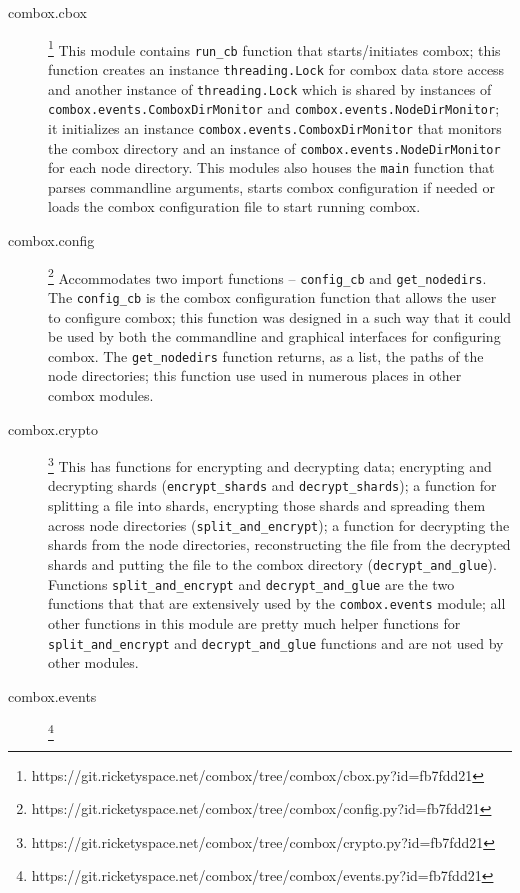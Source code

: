 \begin{description}
\item[combox.cbox]
  \footnote{https://git.ricketyspace.net/combox/tree/combox/cbox.py?id=fb7fdd21}
  This module contains \verb+run_cb+ function that starts/initiates
  combox; this function creates an instance \verb+threading.Lock+ for
  combox data store access and another instance of
  \verb+threading.Lock+ which is shared by instances of
  \verb+combox.events.ComboxDirMonitor+ and
  \verb+combox.events.NodeDirMonitor+; it initializes an instance
  \verb+combox.events.ComboxDirMonitor+ that monitors the combox
  directory and an instance of \verb+combox.events.NodeDirMonitor+ for
  each node directory. This modules also houses the \verb+main+
  function that parses commandline arguments, starts combox
  configuration if needed or loads the combox configuration file to
  start running combox.
\item[combox.config]
  \footnote{https://git.ricketyspace.net/combox/tree/combox/config.py?id=fb7fdd21}
  Accommodates two import functions -- \verb+config_cb+ and
  \verb+get_nodedirs+. The \verb+config_cb+ is the combox
  configuration function that allows the user to configure combox;
  this function was designed in a such way that it could be used by
  both the commandline and graphical interfaces for configuring
  combox. The \verb+get_nodedirs+ function returns, as a list, the
  paths of the node directories; this function use used in numerous
  places in other combox modules.
\item[combox.crypto]
  \footnote{https://git.ricketyspace.net/combox/tree/combox/crypto.py?id=fb7fdd21}
  This has functions for encrypting and decrypting data; encrypting
  and decrypting shards (\verb+encrypt_shards+ and
  \verb+decrypt_shards+); a function for splitting a file into shards,
  encrypting those shards and spreading them across node directories
  (\verb+split_and_encrypt+); a function for decrypting the shards
  from the node directories, reconstructing the file from the
  decrypted shards and putting the file to the combox directory
  (\verb+decrypt_and_glue+). Functions \verb+split_and_encrypt+ and
  \verb+decrypt_and_glue+ are the two functions that that are
  extensively used by the \verb+combox.events+ module; all other
  functions in this module are pretty much helper functions for
  \verb+split_and_encrypt+ and \verb+decrypt_and_glue+ functions and
  are not used by other modules.
\item[combox.events]
  \footnote{https://git.ricketyspace.net/combox/tree/combox/events.py?id=fb7fdd21}

\end{description}
